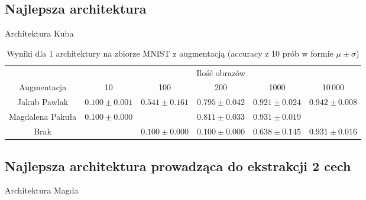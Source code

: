 \documentclass[10pt]{article}
\begin{document}
\subsection*{Najlepsza architektura}

Architektura Kuba

\begin{table}[H]\centering
    \begin{tabular}{cccccc}
        \toprule
                         & \multicolumn{5}{c}{Ilość obrazów}                                                                                   \\ \cmidrule{2-6}
        Augmentacja      & 10                                & 100               & 200                & 1000              & 10\,000            \\ \midrule
        Jakub Pawlak     & $0.100 \pm 0.001 $                & $0.541 \pm 0.161$ & $0.795 \pm 0.042 $ & $0.921 \pm 0.024$ & $0.942 \pm 0.008 $ \\
        Magdalena Pakuła & $0.100 \pm 0.000 $                &                   & $0.811 \pm 0.033 $ & $0.931 \pm 0.019$                      \\
        Brak             &                                   & $0.100 \pm 0.000$ & $0.100 \pm 0.000$  & $0.638 \pm 0.145$ & $0.931 \pm 0.016$  \\
        \bottomrule
    \end{tabular}
    \caption{Wyniki dla 1 architektury na zbiorze MNIST z augmentacją (accuracy z 10 prób w formie $\mu \pm \sigma$)}
\end{table}

\subsection*{Najlepsza architektura prowadząca do ekstrakcji 2 cech}

Architektura Magda
\end{document}
